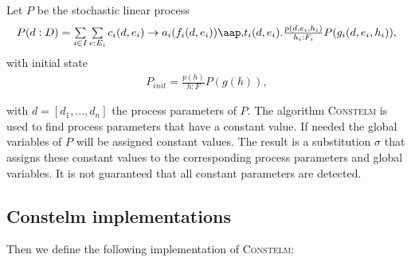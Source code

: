                       

Let $P$ be the stochastic linear process%
\[
\begin{array}{l}
P(d:D)=\sum\limits_{i\in I}\sum\limits_{e:E_{i}}c_{i}(d,e_{i})\rightarrow
a_{i}(f_{i}(d,e_{i}))\at t_{i}(d,e_{i}).\frac{p(d,e_{i},h_{i})}{h_{i}:F_{i}}%
P(g_{i}(d,e_{i},h_{i})),%
\end{array}%
\]%
with initial state%
\[
\begin{array}{l}
P_{init}=\frac{p(h)}{h:F}P(g(h)),%
\end{array}%
\]

with $d=[d_{1},\ldots ,d_{n}]$ the process parameters of $P$. The algorithm 
\textsc{Constelm} is used to find process parameters that have a constant
value. If needed the global variables of $P$ will be assigned constant
values. The result is a substitution $\sigma $ that assigns these constant
values to the corresponding process parameters and global variables. It is
not guaranteed that all constant parameters are detected.

\subsection{Constelm implementations}

Then we define the following implementation of \textsc{Constelm}:

